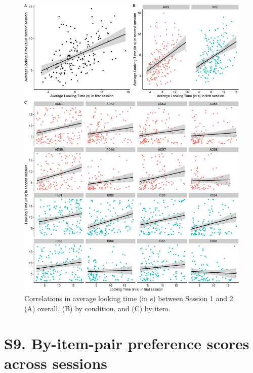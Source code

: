\documentclass[
  man, donotrepeattitle,floatsintext]{apa6}
\begin{document}
\begin{figure}

{\centering \includegraphics{MB1T_supplement_files/figure-latex/sfig8-1} 

}

\caption{Correlations in average looking time (in s) between Session 1 and 2 (A) overall, (B) by condition, and (C) by item.}\label{fig:sfig8}
\end{figure}

\newpage

\hypertarget{s9.-by-item-pair-preference-scores-across-sessions}{%
\section{S9. By-item-pair preference scores across sessions}\label{s9.-by-item-pair-preference-scores-across-sessions}}
\end{document}
